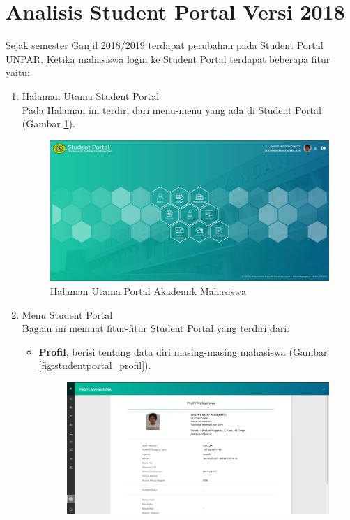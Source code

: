 \section{Analisis Student Portal Versi 2018}

Sejak semester Ganjil 2018/2019 terdapat perubahan pada Student Portal UNPAR. Ketika mahasiswa login ke Student Portal terdapat beberapa fitur yaitu:

\begin{enumerate}
	\item Halaman Utama Student Portal \\
	Pada Halaman ini terdiri dari menu-menu yang ada di Student Portal (Gambar \ref{fig:studentportal_home}).
	\begin{figure}[H]
		\centering
		\includegraphics[scale=0.3]{Gambar/studentportal_home}
		\caption{Halaman Utama Portal Akademik Mahasiswa}
		\label{fig:studentportal_home}
	\end{figure}
	\item Menu Student Portal \\
	Bagian ini memuat fitur-fitur Student Portal yang terdiri dari:
	\begin{itemize}
		\item \textbf{Profil}, berisi tentang data diri masing-masing mahasiswa (Gambar \ref{fig:studentportal_profil}).
		\begin{figure}[H]
		\centering
		\includegraphics[scale=0.3]{Gambar/studentportal_profil}

\end{figure}
\end{itemize}
\end{enumerate}
